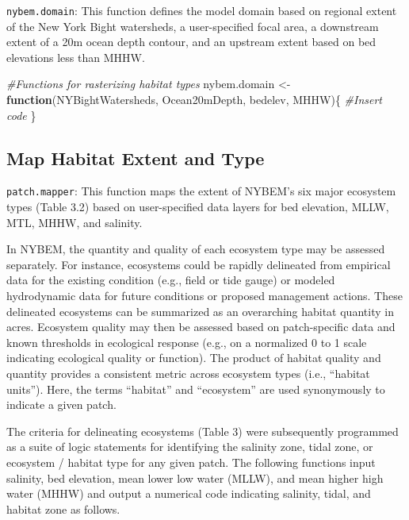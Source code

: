 \documentclass[
]{book}
\newenvironment{Shaded}{\begin{snugshade}}{\end{snugshade}}
\newcommand{\CommentTok}[1]{\textcolor[rgb]{0.56,0.35,0.01}{\textit{#1}}}
\newcommand{\ControlFlowTok}[1]{\textcolor[rgb]{0.13,0.29,0.53}{\textbf{#1}}}
\newcommand{\NormalTok}[1]{#1}
\newcommand{\OtherTok}[1]{\textcolor[rgb]{0.56,0.35,0.01}{#1}}
\begin{document}
\texttt{nybem.domain}: This function defines the model domain based on regional extent of the New York Bight watersheds, a user-specified focal area, a downstream extent of a 20m ocean depth contour, and an upstream extent based on bed elevations less than MHHW.

\begin{Shaded}
\begin{Highlighting}[]
\CommentTok{\#Functions for rasterizing habitat types}
\NormalTok{nybem.domain }\OtherTok{\textless{}{-}} \ControlFlowTok{function}\NormalTok{(NYBightWatersheds, Ocean20mDepth, bedelev, MHHW)\{}
  \CommentTok{\#Insert code}
\NormalTok{\}}
\end{Highlighting}
\end{Shaded}

\hypertarget{map-habitat-extent-and-type}{%
\subsection{Map Habitat Extent and Type}\label{map-habitat-extent-and-type}}

\texttt{patch.mapper}: This function maps the extent of NYBEM's six major ecosystem types (Table 3.2) based on user-specified data layers for bed elevation, MLLW, MTL, MHHW, and salinity.

In NYBEM, the quantity and quality of each ecosystem type may be assessed separately. For instance, ecosystems could be rapidly delineated from empirical data for the existing condition (e.g., field or tide gauge) or modeled hydrodynamic data for future conditions or proposed management actions. These delineated ecosystems can be summarized as an overarching habitat quantity in acres. Ecosystem quality may then be assessed based on patch-specific data and known thresholds in ecological response (e.g., on a normalized 0 to 1 scale indicating ecological quality or function). The product of habitat quality and quantity provides a consistent metric across ecosystem types (i.e., ``habitat units''). Here, the terms ``habitat'' and ``ecosystem'' are used synonymously to indicate a given patch.

The criteria for delineating ecosystems (Table 3) were subsequently programmed as a suite of logic statements for identifying the salinity zone, tidal zone, or ecosystem / habitat type for any given patch. The following functions input salinity, bed elevation, mean lower low water (MLLW), and mean higher high water (MHHW) and output a numerical code indicating salinity, tidal, and habitat zone as follows.
\end{document}
